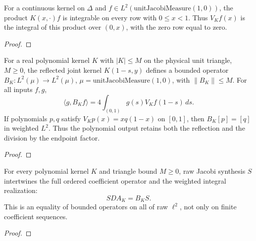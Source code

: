 \begin{supporting}
\begin{theorem}
\label{thm:jacobi-volterra-input}
\leanok
For a continuous kernel on $\Delta$ and $f\in L^2(\mathrm{unitJacobiMeasure}(1,0))$,
the product $K(x,\cdot)f$ is integrable on every row with $0\le x<1$.
Thus $V_Kf(x)$ is the integral of this product over $(0,x)$, with the zero row equal to zero.
\end{theorem}
\begin{proof}
\leanok
\end{proof}

\begin{theorem}
\label{thm:jacobi-volterra-l2}
\leanok
For a real polynomial kernel $K$ with $|K|\le M$ on the physical unit
triangle, $M\ge0$, the reflected joint kernel $K(1-s,y)$ defines a bounded
operator $B_K:L^2(\mu)\to L^2(\mu)$, $\mu=\mathrm{unitJacobiMeasure}(1,0)$,
with $\|B_K\|\le M$. For all inputs $f,g$,
\[
 \langle g,B_Kf\rangle
 =4\int_{(0,1)} g(s)V_Kf(1-s)\,ds.
\]
If polynomials $p,q$ satisfy $V_Kp(x)=xq(1-x)$ on $[0,1]$, then
$B_K[p]=[q]$ in weighted $L^2$. Thus the polynomial output retains both
the reflection and the division by the endpoint factor.
\end{theorem}
\begin{proof}
\leanok
\end{proof}

\begin{theorem}
\label{thm:volterra-raw-l2-agreement}
\leanok
For every polynomial kernel $K$ and triangle bound $M\ge0$, raw Jacobi
synthesis $S$ intertwines the full ordered coefficient operator and the
weighted integral realization:
\[
 S D A_K=B_K S.
\]
This is an equality of bounded operators on all of raw $\ell^2$, not only
on finite coefficient sequences.
\end{theorem}
\begin{proof}
\leanok
\end{proof}




\end{supporting}
